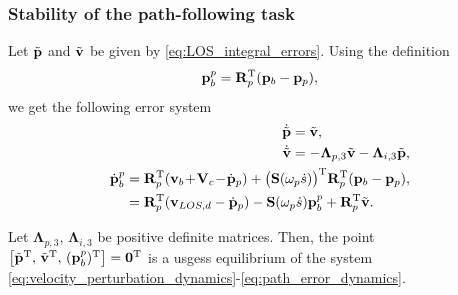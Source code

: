 \subsubsection{Stability of the path-following task}
Let $\Tilde{\mathbf{p}}$ and $\Tilde{\mathbf{v}}$ be given by \eqref{eq:LOS_integral_errors}. Using the definition
\begin{equation}
    \mathbf{p}_b^p = \mathbf{R}_p^{\mathrm{T}}(\mathbf{p}_b - \mathbf{p}_p),
\end{equation}
we get the following error system
\begin{subequations}
\begin{align}
    \begin{split}\label{eq:velocity_perturbation_dynamics}
        \dot{\Tilde{\mathbf{p}}} &= \Tilde{\mathbf{v}},\\
        \dot{\Tilde{\mathbf{v}}} &= -\mathbf{\Lambda}_{p,3} \Tilde{\mathbf{v}} - \mathbf{\Lambda}_{i,3}\Tilde{\mathbf{p}},
    \end{split} \\
        \begin{split}
            \dot{\mathbf{p}}_b^p &= \mathbf{R}_p^{\mathrm{T}}(\mathbf{v}_b \!+\! \mathbf{V}_c\!-\!\dot{\mathbf{p}}_p) +  \bigl(\mathbf{S}(\omega_p \dot{s})\bigr)^{\mathrm{T}}\mathbf{R}_p^{\mathrm{T}}(\mathbf{p}_b - \mathbf{p}_p),\\
            &= \mathbf{R}_p^{\mathrm{T}}(\mathbf{v}_{LOS,d} -\dot{\mathbf{p}}_p) - \mathbf{S}(\omega_p \dot{s})\mathbf{p}_b^p +\mathbf{R}_p^{\mathrm{T}}\Tilde{\mathbf{v}}.\label{eq:path_error_dynamics}
        \end{split} 
\end{align}
\end{subequations}
\begin{theorem}\label{theorem:path_error}
    Let $\bm{\Lambda}_{p,3}$, $\bm{\Lambda}_{i,3}$ be positive definite matrices. Then, the point $\left[\Tilde{\mathbf{p}}^{\mathrm{T}},\, \Tilde{\mathbf{v}}^{\mathrm{T}}, \,(\mathbf{p}_b^p)^{\mathrm{T}}\right] = \mathbf{0}^{\mathrm{T}}$ is a \glspl{usges} equilibrium of the system \eqref{eq:velocity_perturbation_dynamics}-\eqref{eq:path_error_dynamics}.    
\end{theorem}


